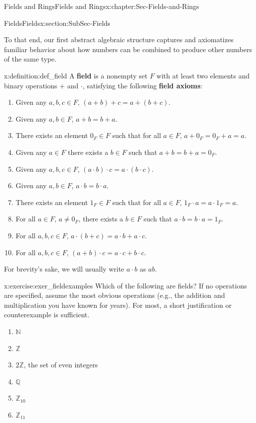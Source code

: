 \documentclass[oneside,10pt,]{book}
\newcommand{\terminology}[1]{\textbf{#1}}
\numberwithin{equation}{section}
\def\Z{{\mathbb Z}}
\def\Q{{\mathbb Q}}
\def\N{{\mathbb N}}
\begin{document}
\begin{chapterptx}{Fields and Rings}{}{Fields and Rings}{}{}{x:chapter:Sec-Fields-and-Rings}
\begin{sectionptx}{Fields}{}{Fields}{}{}{x:section:SubSec-Fields}
\par
To that end, our first abstract algebraic structure captures and axiomatizes familiar behavior about how numbers can be combined to produce other numbers of the same type.%
\begin{definition}{}{x:definition:def_field}%
A \terminology{field} is a nonempty set \(F\) with at least two elements and binary operations \(+\) and \(\cdot\), satisfying the following \terminology{field axioms}:%
\begin{enumerate}
\item{}Given any \(a,b,c\in F\), \((a+b)+c = a+(b+c)\).%
\item{}Given any \(a,b\in F\), \(a+b= b+a\).%
\item{}There exists an element \(0_F\in F\) such that for all \(a\in F\), \(a+0_F = 0_F + a = a\).%
\item{}Given any \(a\in F\) there exists a \(b\in F\) such that \(a+b = b + a =0_F\).%
\item{}Given any \(a,b,c\in F\), \((a\cdot b)\cdot c = a\cdot (b\cdot c)\).%
\item{}Given any \(a,b\in F\), \(a\cdot b = b\cdot a\).%
\item{}There exists an element \(1_F\in F\) such that for all \(a\in F\), \(1_F\cdot a = a\cdot 1_F = a\).%
\item{}For all \(a\in F\), \(a\ne 0_F\), there exists a \(b\in F\) such that \(a\cdot b = b\cdot a = 1_F\).%
\item{}For all \(a,b,c\in F\), \(a\cdot (b+c) = a\cdot b + a\cdot c\).%
\item{}For all \(a,b,c\in F\), \((a+b)\cdot c = a\cdot c + b\cdot c\).%
\end{enumerate}
%
\end{definition}
For brevity's sake, we will usually write \(a\cdot b\) as \(ab\).%
\begin{inlineexercise}{}{x:exercise:exer_fieldexamples}%
Which of the following are fields? If no operations are specified, assume the most obvious operations (e.g., the addition and multiplication you have known for years). For most, a short justification or counterexample is sufficient.%
\begin{enumerate}
\item{}\(\N\)%
\item{}\(\Z\)%
\item{}\(2\Z\), the set of even integers%
\item{}\(\Q\)%
\item{}\(\Z_{10}\)%
\item{}\(\Z_{11}\)%

\end{enumerate}
\end{inlineexercise}
\end{sectionptx}
\end{chapterptx}
\end{document}
